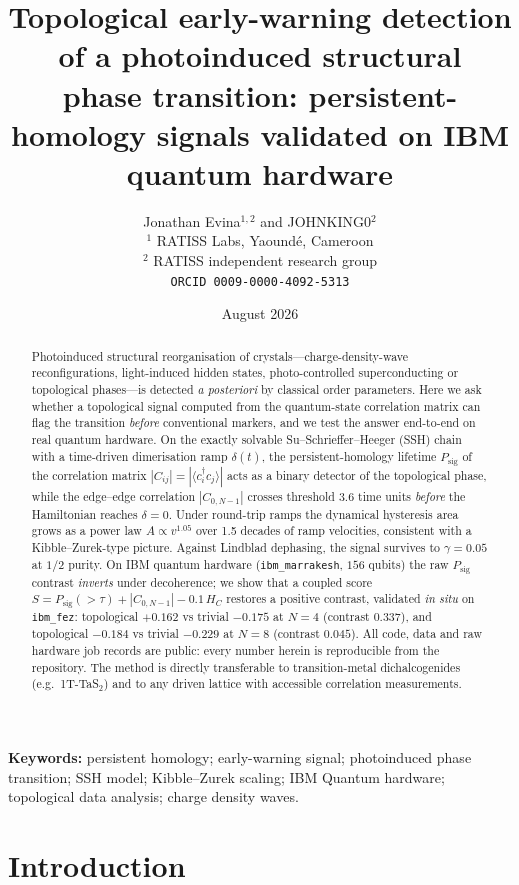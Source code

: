 \documentclass[11pt]{article}
\title{\textbf{Topological early-warning detection of a photoinduced structural\\
phase transition: persistent-homology signals validated on IBM quantum hardware}}
\author{Jonathan Evina$^{1,2}$ and JOHNKING0$^{2}$\\
\small $^{1}$ RATISS Labs, Yaound\'e, Cameroon\\
\small $^{2}$ RATISS independent research group\\
\small \texttt{ORCID 0009-0000-4092-5313}}
\date{August 2026}
\begin{document}
\maketitle

\begin{abstract}
Photoinduced structural reorganisation of crystals---charge-density-wave
reconfigurations, light-induced hidden states, photo-controlled
superconducting or topological phases---is detected \emph{a posteriori} by
classical order parameters. Here we ask whether a topological signal computed
from the quantum-state correlation matrix can flag the transition
\emph{before} conventional markers, and we test the answer end-to-end on
real quantum hardware. On the exactly solvable Su--Schrieffer--Heeger (SSH)
chain with a time-driven dimerisation ramp $\delta(t)$, the
persistent-homology lifetime $P_{\mathrm{sig}}$ of the correlation matrix
$|C_{ij}| = |\langle c_i^\dagger c_j\rangle|$ acts as a binary detector of
the topological phase, while the edge--edge correlation $|C_{0,N-1}|$
crosses threshold $3.6$ time units \emph{before} the Hamiltonian reaches
$\delta=0$. Under round-trip ramps the dynamical hysteresis area grows as a
power law $A \propto v^{1.05}$ over 1.5 decades of ramp velocities,
consistent with a Kibble--Zurek-type picture. Against Lindblad dephasing,
the signal survives to $\gamma = 0.05$ at $1/2$ purity. On IBM quantum
hardware (\texttt{ibm\_marrakesh}, $156$ qubits) the raw $P_{\mathrm{sig}}$
contrast \emph{inverts} under decoherence; we show that a coupled score
$S = P_{\mathrm{sig}}(>\!\tau) + |C_{0,N-1}| - 0.1\,H_{C}$ restores a
positive contrast, validated \emph{in situ} on \texttt{ibm\_fez}:
topological $+0.162$ vs trivial $-0.175$ at $N=4$ (contrast $0.337$), and
topological $-0.184$ vs trivial $-0.229$ at $N=8$ (contrast $0.045$). All
code, data and raw hardware job records are public: every number herein is
reproducible from the repository. The method is directly transferable to
transition-metal dichalcogenides (e.g.\ 1T-TaS$_2$) and to any driven
lattice with accessible correlation measurements.
\end{abstract}

\noindent\textbf{Keywords:} persistent homology; early-warning signal;
photoinduced phase transition; SSH model; Kibble--Zurek scaling; IBM Quantum
hardware; topological data analysis; charge density waves.

\section{Introduction}
\end{document}
